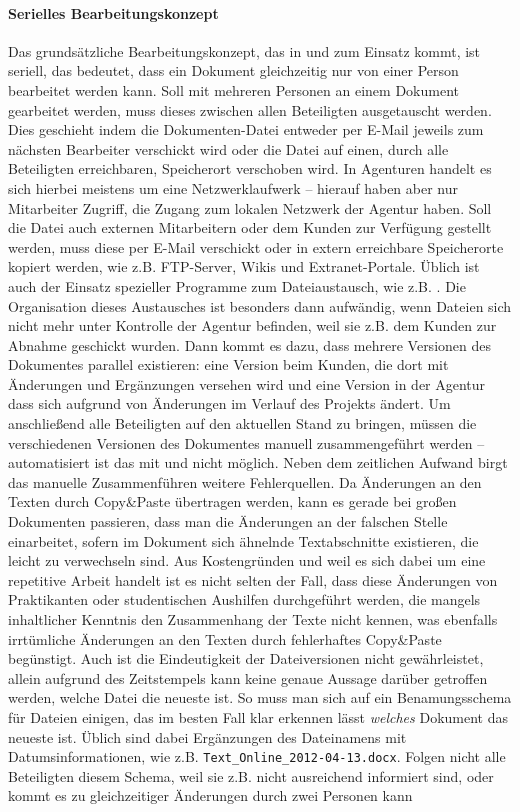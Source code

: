 \bigskip

\label{p:serielles-konzept}\paragraph{Serielles Bearbeitungskonzept} Das grundsätzliche Bearbeitungskonzept, das in  und  zum Einsatz kommt, ist seriell, das bedeutet, dass ein Dokument gleichzeitig nur von einer Person bearbeitet werden kann. Soll mit mehreren Personen an einem Dokument gearbeitet werden, muss dieses zwischen allen Beteiligten ausgetauscht werden. Dies geschieht indem die Dokumenten-Datei entweder per E-Mail jeweils zum nächsten Bearbeiter verschickt wird oder die Datei auf einen, durch alle Beteiligten erreichbaren, Speicherort verschoben wird. In Agenturen handelt es sich hierbei meistens um eine Netzwerklaufwerk -- hierauf haben aber nur Mitarbeiter Zugriff, die Zugang zum lokalen Netzwerk der Agentur haben. Soll die Datei auch externen Mitarbeitern oder dem Kunden zur Verfügung gestellt werden, muss diese per E-Mail verschickt oder in extern erreichbare Speicherorte kopiert werden, wie z.B. FTP-Server, Wikis und Extranet-Portale. Üblich ist auch der Einsatz spezieller Programme zum Dateiaustausch, wie z.B. . Die Organisation dieses Austausches ist besonders dann aufwändig, wenn Dateien sich nicht mehr unter Kontrolle der Agentur befinden, weil sie z.B. dem Kunden zur Abnahme geschickt wurden. Dann kommt es dazu, dass mehrere Versionen des Dokumentes parallel existieren: eine Version beim Kunden, die dort mit Änderungen und Ergänzungen versehen wird und eine Version in der Agentur dass sich aufgrund von Änderungen im Verlauf des Projekts ändert. Um anschließend alle Beteiligten auf den aktuellen Stand zu bringen, müssen die verschiedenen Versionen des Dokumentes manuell zusammengeführt werden -- automatisiert ist das mit  und  nicht möglich. Neben dem zeitlichen Aufwand birgt das manuelle Zusammenführen weitere Fehlerquellen. Da Änderungen an den Texten durch Copy\&Paste übertragen werden, kann es gerade bei großen Dokumenten passieren, dass man die Änderungen an der falschen Stelle einarbeitet, sofern im Dokument sich ähnelnde Textabschnitte existieren, die leicht zu verwechseln sind. Aus Kostengründen und weil es sich dabei um eine repetitive Arbeit handelt ist es nicht selten der Fall, dass diese Änderungen von Praktikanten oder studentischen Aushilfen durchgeführt werden, die mangels inhaltlicher Kenntnis den Zusammenhang der Texte nicht kennen, was ebenfalls irrtümliche Änderungen an den Texten durch fehlerhaftes Copy\&Paste begünstigt. Auch ist die Eindeutigkeit der Dateiversionen nicht gewährleistet, allein aufgrund des Zeitstempels kann keine genaue Aussage darüber getroffen werden, welche Datei die neueste ist. So muss man sich auf ein Benamungsschema für Dateien einigen, das im besten Fall klar erkennen lässt \emph{welches} Dokument das neueste ist. Üblich sind dabei Ergänzungen des Dateinamens mit Datumsinformationen, wie z.B. \texttt{Text\_Online\_2012-04-13.docx}. Folgen nicht alle Beteiligten diesem Schema, weil sie z.B. nicht ausreichend informiert sind, oder kommt es zu gleichzeitiger Änderungen durch zwei Personen kann 